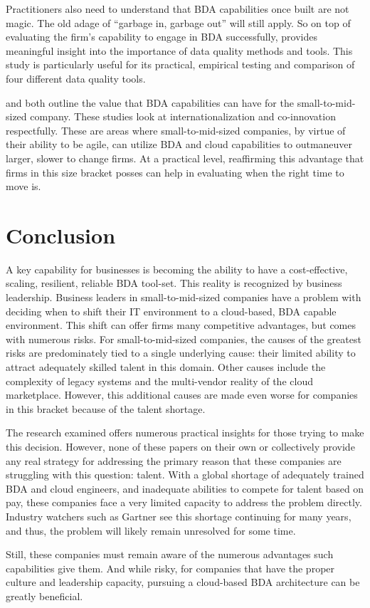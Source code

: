 Practitioners also need to understand that BDA capabilities once built are not magic. The old adage of ``garbage in, garbage out'' will still apply. So on top of evaluating the firm's capability to engage in BDA successfully, \textcite{souibguiDataQualityETL2019} provides meaningful insight into the importance of data quality methods and tools. This study is particularly useful for its practical, empirical testing and comparison of four different data quality tools.

\textcite{chengFacilitatingSpeedInternationalization2020} and \textcite{lozadaBigDataAnalytics2019} both outline the value that BDA capabilities can have for the small-to-mid-sized company. These studies look at internationalization and co-innovation respectfully. These are areas where small-to-mid-sized companies, by virtue of their ability to be agile, can utilize BDA and cloud capabilities to outmaneuver larger, slower to change firms. At a practical level, reaffirming this advantage that firms in this size bracket posses can help in evaluating when the right time to move is.

\section{Conclusion}

A key capability for businesses is becoming the ability to have a cost-effective, scaling, resilient, reliable BDA tool-set. This reality is recognized by business leadership. Business leaders in small-to-mid-sized companies have a problem with deciding when to shift their IT environment to a cloud-based, BDA capable environment. This shift can offer firms many competitive advantages, but comes with numerous risks. For small-to-mid-sized companies, the causes of the greatest risks are predominately tied to a single underlying cause: their limited ability to attract adequately skilled talent in this domain. Other causes include the complexity of legacy systems and the multi-vendor reality of the cloud marketplace. However, this additional causes are made even worse for companies in this bracket because of the talent shortage.

The research examined offers numerous practical insights for those trying to make this decision. However, none of these papers on their own or collectively provide any real strategy for addressing the primary reason that these companies are struggling with this question: talent. With a global shortage of adequately trained BDA and cloud engineers, and inadequate abilities to compete for talent based on pay, these companies face a very limited capacity to address the problem directly. Industry watchers such as Gartner see this shortage continuing for many years, and thus, the problem will likely remain unresolved for some time.

Still, these companies must remain aware of the numerous advantages such capabilities give them. And while risky, for companies that have the proper culture and leadership capacity, pursuing a cloud-based BDA architecture can be greatly beneficial.
